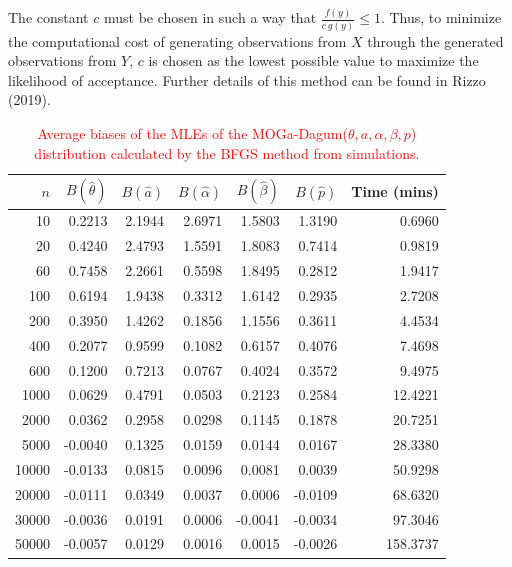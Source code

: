 \documentclass[twoside,leqno,11pt]{article}
\begin{document}
The constant $c$ must be chosen in such a way that $\frac{f(y)}{c \,g (y)}\leq 1 $. Thus, to minimize the computational cost of generating observations from $X$ through the generated observations from $Y$, $c$ is chosen as the lowest possible value to maximize the likelihood of acceptance. Further details of this method can be found in Rizzo (2019).

\begin{table}[H]
\centering
\caption{\textcolor{red}{Average biases of the MLEs of the MOGa-Dagum($\theta, a, \alpha, \beta, p$) distri\-bu\-tion 
calculated by the BFGS method from simulations.}}\label{tab:bias1}
	\begin{tabular}{rrrrrrr}
		\hline
		$n$ & $B(\hat{\theta})$ & $B(\hat{a})$ & $B(\hat{\alpha})$ & $B(\hat{\beta})$ & $B(\hat{p})$ & Time (mins)\\
		\hline
10 & 0.2213 & 2.1944 & 2.6971 & 1.5803 & 1.3190 & 0.6960 \\ 
20 & 0.4240 & 2.4793 & 1.5591 & 1.8083 & 0.7414 & 0.9819 \\ 
60 & 0.7458 & 2.2661 & 0.5598 & 1.8495 & 0.2812 & 1.9417 \\ 
100 & 0.6194 & 1.9438 & 0.3312 & 1.6142 & 0.2935 & 2.7208 \\ 
200 & 0.3950 & 1.4262 & 0.1856 & 1.1556 & 0.3611 & 4.4534 \\ 
400 & 0.2077 & 0.9599 & 0.1082 & 0.6157 & 0.4076 & 7.4698 \\ 
600 & 0.1200 & 0.7213 & 0.0767 & 0.4024 & 0.3572 & 9.4975 \\ 
1000 & 0.0629 & 0.4791 & 0.0503 & 0.2123 & 0.2584 & 12.4221 \\ 
2000 & 0.0362 & 0.2958 & 0.0298 & 0.1145 & 0.1878 & 20.7251 \\ 
5000 & -0.0040 & 0.1325 & 0.0159 & 0.0144 & 0.0167 & 28.3380 \\ 
10000 & -0.0133 & 0.0815 & 0.0096 & 0.0081 & 0.0039 & 50.9298 \\ 
20000 & -0.0111 & 0.0349 & 0.0037 & 0.0006 & -0.0109 & 68.6320 \\ 
30000 & -0.0036 & 0.0191 & 0.0006 & -0.0041 & -0.0034 & 97.3046 \\ 
50000 & -0.0057 & 0.0129 & 0.0016 & 0.0015 & -0.0026 & 158.3737 \\ 
		\hline
	\end{tabular}
\end{table}
\end{document}
